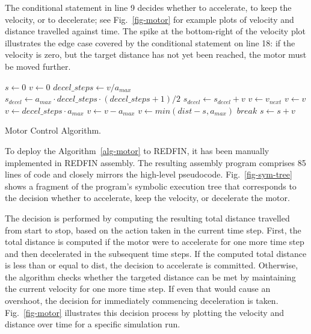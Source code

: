 The conditional statement in line 9 decides whether
to accelerate, to keep the velocity, or to decelerate;
see Fig.~\ref{fig-motor} for example plots of velocity and distance travelled
against time. The spike at the bottom-right of the velocity plot illustrates
the edge case covered by the conditional statement on line 18: if the velocity
is zero, but the target distance has not yet been reached, the motor must be
moved further.

\begin{algorithm}[h]
  \begin{algorithmic}[1]
\State $s \gets 0$
\State $v \gets 0$
  \State $decel\_steps\gets v / a_{max}$
  \State $s_{decel} \gets a_{max} \cdot decel\_steps \cdot (decel\_steps + 1) / 2$
    \State $s_{decel} \gets s_{decel} + v$
  \EndIf
    \State $v \gets v_{next}$ 
    \State $ v \gets v $     
  \Else
      \State $v \gets decel\_steps \cdot a_{max}$
    \Else
      \State $v \gets v - a_{max}$
      \EndIf
  \EndIf
      
      \State $v \gets min(dist - s, a_{max})$
    \Else
      \State $break$  
      \EndIf
      \EndIf
  \State $s \gets s + v$
\EndWhile
\end{algorithmic}
\caption{Motor Control Algorithm.\label{alg-motor}}
\end{algorithm}

To deploy the Algorithm~\ref{alg-motor} to REDFIN, it has been manually
implemented in REDFIN assembly. The resulting assembly program comprises 85 lines of
code and closely mirrors the high-level pseudocode. Fig.~\ref{fig-sym-tree} shows
a fragment of the program's symbolic execution tree that corresponds to the
decision whether to accelerate, keep the velocity, or decelerate the motor.

The decision is performed by computing the resulting total distance
travelled from start to stop, based on the action taken in the current
time step.  First, the total distance is computed if the motor were to
accelerate for one more time step and then decelerated in the
subsequent time steps.  If the computed total distance is less than or
equal to dist, the decision to accelerate is committed.  Otherwise,
the algorithm checks whether the targeted distance can be met by
maintaining the current velocity for one more time step.  If even that
would cause an overshoot, the decision for immediately commencing
deceleration is taken. Fig.~\ref{fig-motor} illustrates this decision process by
plotting the velocity and distance over time for a specific simulation
run.

